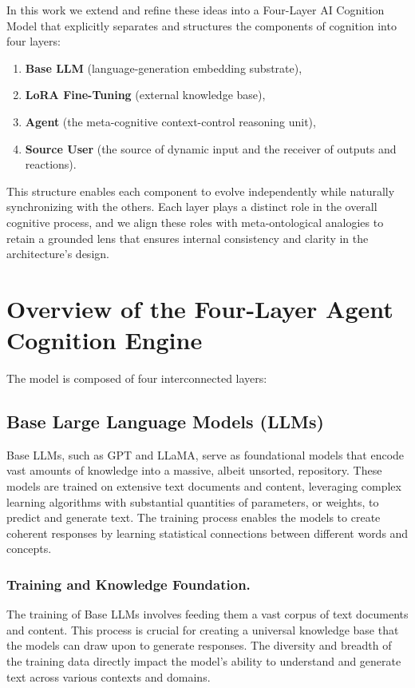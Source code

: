 \documentclass{article}
\begin{document}
In this work we extend and refine these ideas into a Four-Layer AI Cognition Model that explicitly separates and structures the components of cognition into four layers:

\begin{enumerate}
  \item \textbf{Base LLM} (language-generation embedding substrate),
  \item \textbf{LoRA Fine-Tuning} (external knowledge base),
  \item \textbf{Agent} (the meta-cognitive context-control reasoning unit),
  \item \textbf{Source User} (the source of dynamic input and the receiver of outputs and reactions).
\end{enumerate}

This structure enables each component to evolve independently while naturally synchronizing with the others. Each layer plays a distinct role in the overall cognitive process, and we align these roles with meta-ontological analogies to retain a grounded lens that ensures internal consistency and clarity in the architecture’s design.

\hrulefill

\section{Overview of the Four-Layer Agent Cognition Engine}

The model is composed of four interconnected layers:

\subsection{Base Large Language Models (LLMs)}
Base LLMs, such as GPT and LLaMA, serve as foundational models that encode vast amounts of knowledge into a massive, albeit unsorted, repository. These models are trained on extensive text documents and content, leveraging complex learning algorithms with substantial quantities of parameters, or weights, to predict and generate text. The training process enables the models to create coherent responses by learning statistical connections between different words and concepts.

\subsubsection{Training and Knowledge Foundation.} The training of Base LLMs involves feeding them a vast corpus of text documents and content. This process is crucial for creating a universal knowledge base that the models can draw upon to generate responses. The diversity and breadth of the training data directly impact the model’s ability to understand and generate text across various contexts and domains.
\end{document}
